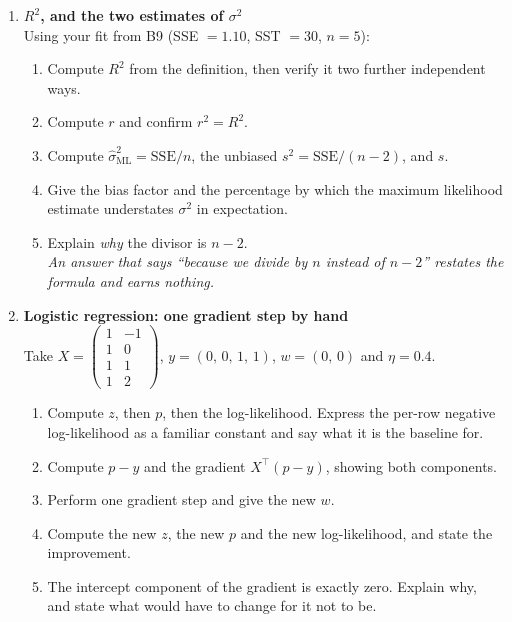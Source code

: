 \documentclass[11pt,a4paper]{article}
\begin{document}
\begin{enumerate}[label=\textbf{B\arabic*.}, leftmargin=*]
  \item \textbf{$R^2$, and the two estimates of $\sigma^2$} \\
    Using your fit from B9 (SSE $= 1.10$, SST $= 30$, $n = 5$):
    \begin{enumerate}[label=(\alph*), leftmargin=*]
      \item Compute $R^2$ from the definition, then verify it two further
        independent ways. 
      \item Compute $r$ and confirm $r^2 = R^2$. 
      \item Compute $\hat\sigma^2_{\text{ML}} = \text{SSE}/n$, the unbiased
        $s^2 = \text{SSE}/(n-2)$, and $s$. 
      \item Give the bias factor and the percentage by which the maximum
        likelihood estimate understates $\sigma^2$ in expectation. 
      \item Explain \emph{why} the divisor is $n-2$. \\
        \emph{An answer that says ``because we divide by $n$ instead of
        $n-2$'' restates the formula and earns nothing.}
    \end{enumerate}

  \item \textbf{Logistic regression: one gradient step by hand} \\
    Take $X = \begin{pmatrix} 1 & -1\\ 1 & 0\\ 1 & 1\\ 1 & 2\end{pmatrix}$,
    $y = (0,\,0,\,1,\,1)$, $w = (0,\,0)$ and $\eta = 0.4$.
    \begin{enumerate}[label=(\alph*), leftmargin=*]
      \item Compute $z$, then $p$, then the log-likelihood. Express the
        per-row negative log-likelihood as a familiar constant and say what it
        is the baseline for. 
      \item Compute $p - y$ and the gradient $X^\top(p-y)$, showing both
        components. 
      \item Perform one gradient step and give the new $w$. 
      \item Compute the new $z$, the new $p$ and the new log-likelihood, and
        state the improvement. 
      \item The intercept component of the gradient is exactly zero. Explain
        why, and state what would have to change for it not to be. 
    \end{enumerate}

\end{enumerate}
\end{document}
